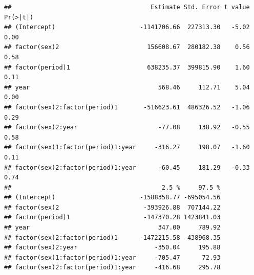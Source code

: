 \documentclass[
]{book}
\newenvironment{Shaded}{\begin{snugshade}}{\end{snugshade}}
\newcommand{\AttributeTok}[1]{\textcolor[rgb]{0.77,0.63,0.00}{#1}}
\newcommand{\CommentTok}[1]{\textcolor[rgb]{0.56,0.35,0.01}{\textit{#1}}}
\newcommand{\DecValTok}[1]{\textcolor[rgb]{0.00,0.00,0.81}{#1}}
\newcommand{\DocumentationTok}[1]{\textcolor[rgb]{0.56,0.35,0.01}{\textbf{\textit{#1}}}}
\newcommand{\FunctionTok}[1]{\textcolor[rgb]{0.00,0.00,0.00}{#1}}
\newcommand{\NormalTok}[1]{#1}
\newcommand{\OtherTok}[1]{\textcolor[rgb]{0.56,0.35,0.01}{#1}}
\newcommand{\SpecialCharTok}[1]{\textcolor[rgb]{0.00,0.00,0.00}{#1}}
\begin{document}
\begin{Shaded}
\end{Shaded}

\begin{verbatim}
##                                      Estimate Std. Error t value Pr(>|t|)
## (Intercept)                       -1141706.66  227313.30   -5.02     0.00
## factor(sex)2                        156608.67  280182.38    0.56     0.58
## factor(period)1                     638235.37  399815.90    1.60     0.11
## year                                   568.46     112.71    5.04     0.00
## factor(sex)2:factor(period)1       -516623.61  486326.52   -1.06     0.29
## factor(sex)2:year                      -77.08     138.92   -0.55     0.58
## factor(sex)1:factor(period)1:year     -316.27     198.07   -1.60     0.11
## factor(sex)2:factor(period)1:year      -60.45     181.29   -0.33     0.74
##                                         2.5 %     97.5 %
## (Intercept)                       -1588358.77 -695054.56
## factor(sex)2                       -393926.88  707144.22
## factor(period)1                    -147370.28 1423841.03
## year                                   347.00     789.92
## factor(sex)2:factor(period)1      -1472215.58  438968.35
## factor(sex)2:year                     -350.04     195.88
## factor(sex)1:factor(period)1:year     -705.47      72.93
## factor(sex)2:factor(period)1:year     -416.68     295.78
\end{verbatim}
\end{document}
